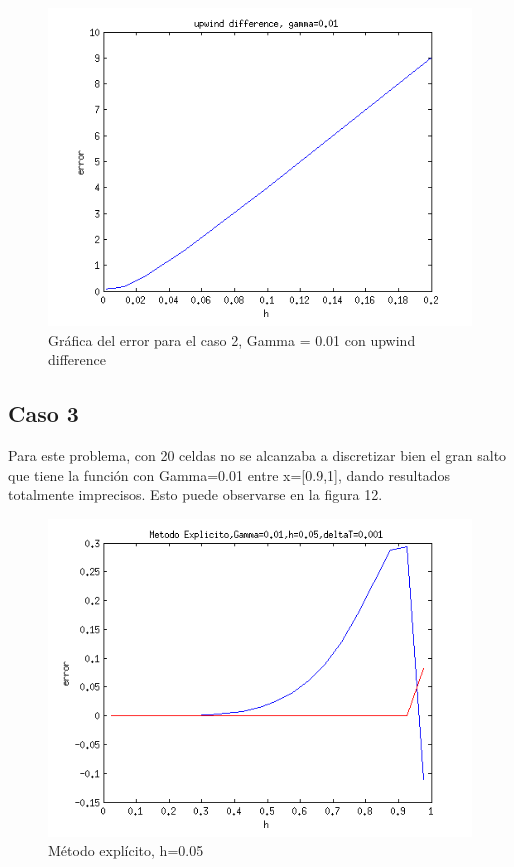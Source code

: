 \documentclass[11pt]{article}
\begin{document}
\begin{figure}[tbh]
	\centering
		\includegraphics[width=1.0\textwidth]{imagen11.png}
	\caption{Gr\'afica del error para el caso 2, Gamma = 0.01 con upwind difference}
	\label{fig:Fig1}
\end{figure}

\subsection{Caso 3}

Para este problema, con 20 celdas no se alcanzaba a discretizar bien el gran salto que tiene la funci\'on con Gamma=0.01 entre x=[0.9,1], dando resultados totalmente imprecisos. Esto puede observarse en la figura 12. 

\begin{figure}[tbh]
	\centering
		\includegraphics[width=1.0\textwidth]{imagen12.png}
	\caption{M\'etodo expl\'icito, h=0.05}
	\label{fig:Fig1}
\end{figure}
\end{document}
